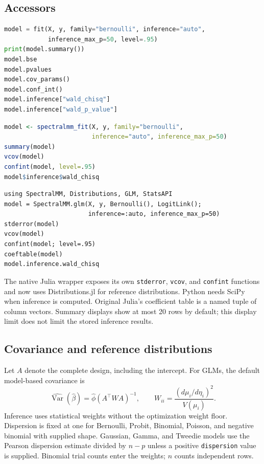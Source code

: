 \documentclass[11pt,a4paper]{article}
\newcommand{\code}[1]{\texttt{#1}}
\begin{document}
\subsection{Accessors}
\begin{lstlisting}[language=Python]
model = fit(X, y, family="bernoulli", inference="auto",
            inference_max_p=50, level=.95)
print(model.summary())
model.bse
model.pvalues
model.cov_params()
model.conf_int()
model.inference["wald_chisq"]
model.inference["wald_p_value"]
\end{lstlisting}
\begin{lstlisting}[language=R]
model <- spectralmm_fit(X, y, family="bernoulli",
                        inference="auto", inference_max_p=50)
summary(model)
vcov(model)
confint(model, level=.95)
model$inference$wald_chisq
\end{lstlisting}
\begin{lstlisting}
using SpectralMM, Distributions, GLM, StatsAPI
model = SpectralMM.glm(X, y, Bernoulli(), LogitLink();
                       inference=:auto, inference_max_p=50)
stderror(model)
vcov(model)
confint(model; level=.95)
coeftable(model)
model.inference.wald_chisq
\end{lstlisting}
The native Julia wrapper exposes its own \code{stderror}, \code{vcov}, and
\code{confint} functions and now uses Distributions.jl for reference distributions.
Python needs SciPy when inference is computed. Original Julia's coefficient table
is a named tuple of column vectors. Summary displays show at most 20 rows by
default; this display limit does not limit the stored inference results.

\subsection{Covariance and reference distributions}
Let $A$ denote the complete design, including the intercept. For GLMs, the default
model-based covariance is
\[
 \widehat{\operatorname{Var}}(\widehat\beta)
 =\widehat\phi(A^\top W A)^{-1},\qquad
 W_{ii}=\frac{(d\mu_i/d\eta_i)^2}{V(\mu_i)}.
\]
Inference uses statistical weights without the optimization weight floor.
Dispersion is fixed at one for Bernoulli, Probit, Binomial, Poisson, and
negative binomial with supplied shape. Gaussian, Gamma, and Tweedie models use
the Pearson dispersion estimate divided by $n-p$ unless a positive
\code{dispersion} value is supplied. Binomial trial counts enter the weights;
$n$ counts independent rows.
\end{document}
